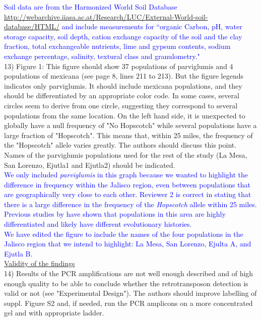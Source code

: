 \documentclass[11pt]{article}
\newcommand{\res}[1]{\noindent \textcolor{blue}{{#1}} \\}
\begin{document}
\res{Soil data are from the Harmonized World Soil Database \url{http://webarchive.iiasa.ac.at/Research/LUC/External-World-soil-database/HTML/} and include measurements for ``organic Carbon, pH, water storage capacity, soil depth, cation exchange capacity of the soil and the clay fraction, total exchangeable nutrients, lime and gypsum contents, sodium exchange percentage, salinity, textural class and granulometry."}

13) Figure 1: This figure should show 37 populations of parviglumis and 4 populations of mexicana (see page 8, lines 211 to 213). But the figure legends indicates only parviglumis. It should include mexicana populations, and they should be differentiated by an appropriate color code. In some cases, several circles seem to derive from one circle, suggesting they correspond to several populations from the same location. On the left hand side, it is unexpected to globally have a null frequency of "No Hopscotch" while several populations have a large fraction of "Hopscotch". This means that, within 25 miles, the frequency of the "Hopscotch" allele varies greatly. The authors should discuss this point. Names of the parviglumis populations used for the rest of the study (La Mesa, San Lorenzo, Ejutla1 and Ejutla2) should be indicated.\\

\res{We only included \emph{parviglumis} in this graph because we wanted to highlight the difference in frequency within the Jalisco region, even between populations that are geographically very close to each other. Reviewer 2 is correct in stating that there is a large difference in the frequency of the \emph{Hopscotch} allele within 25 miles. Previous studies by \citet{Hufford2010, Moeller01072007} have shown that populations in this area are highly differentiated and likely have different evolutionary histories.}

\res{We have edited the figure to include the names of the four populations in the Jalisco region that we intend to highlight: La Mesa, San Lorenzo, Ejulta A, and Ejutla B.}


\underline{Validity of the findings}\\

14) Results of the PCR amplifications are not well enough described and of high enough quality to be able to conclude whether the retrotransposon detection is valid or not (see "Experimental Design"). The authors should improve labelling of suppl. Figure S2 and, if needed, run the PCR amplicons on a more concentrated gel and with appropriate ladder.\\
\end{document}
